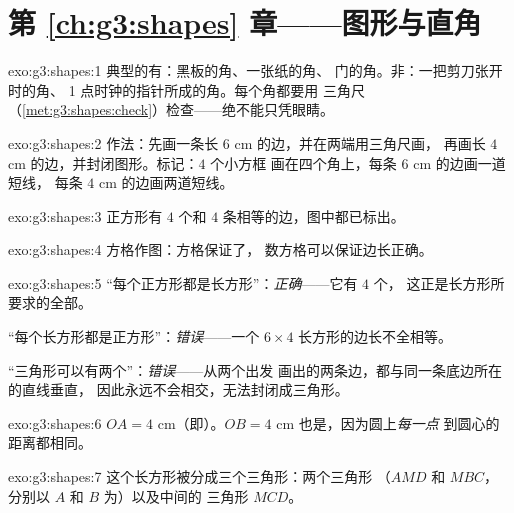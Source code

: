 \section*{第 \ref{ch:g3:shapes} 章——图形与直角}

\begin{solution}{exo:g3:shapes:1}
典型的有：黑板的角、一张纸的角、
门的角。非：一把剪刀张开时的角、
1 点时钟的指针所成的角。每个角都要用
三角尺（\cref{met:g3:shapes:check}）检查——绝不能只凭眼睛。
\end{solution}

\begin{solution}{exo:g3:shapes:2}
作法：先画一条长 $6$ cm 的边，并在两端用三角尺画，
再画长 $4$ cm 的边，并封闭图形。标记：$4$ 个小方框
画在四个角上，每条 $6$ cm 的边画一道短线，
每条 $4$ cm 的边画两道短线。
\end{solution}

\begin{solution}{exo:g3:shapes:3}
正方形有 $4$ 个和 $4$ 条相等的边，图中都已标出。
\end{solution}

\begin{solution}{exo:g3:shapes:4}
方格作图：方格保证了，
数方格可以保证边长正确。
\end{solution}

\begin{solution}{exo:g3:shapes:5}
“每个正方形都是长方形”：\emph{正确}——它有 $4$ 个，
这正是长方形所要求的全部。

“每个长方形都是正方形”：\emph{错误}——一个 $6 \times 4$
长方形的边长不全相等。

“三角形可以有两个”：\emph{错误}——从两个出发
画出的两条边，都与同一条底边所在的直线垂直，
因此永远不会相交，无法封闭成三角形。
\end{solution}

\begin{solution}{exo:g3:shapes:6}
$OA = 4$ cm（即）。$OB = 4$ cm 也是，因为圆上\emph{每一点}
到圆心的距离都相同。
\end{solution}

\begin{solution}{exo:g3:shapes:7}
这个长方形被分成三个三角形：两个三角形
（$AMD$ 和 $MBC$，分别以 $A$ 和 $B$ 为）以及中间的
三角形 $MCD$。
\end{solution}

